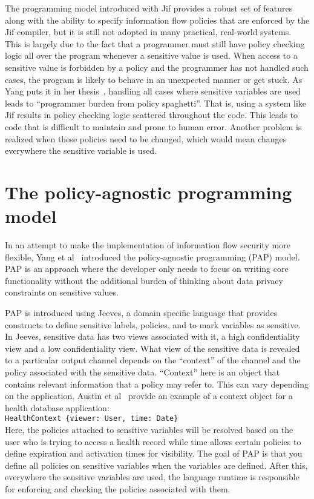 The programming model introduced with Jif provides a robust set of features along
with the ability to specify information flow policies that are enforced by the Jif
compiler, but it is still not adopted in many practical, real-world systems. This
is largely due to the fact that a programmer must still have policy checking logic
all over the program whenever a sensitive value is used. When access to a sensitive
value is forbidden by a policy and the programmer has not handled such cases, the
program is likely to behave in an unexpected manner or get stuck. As Yang puts it
in her thesis~\cite{YangPhd}, handling all cases where sensitive variables are used
leads to ``programmer burden from policy spaghetti''. That is, using a system like
Jif results in policy checking logic scattered throughout the code. This leads to
code that is difficult to maintain and prone to human error. Another problem is
realized when these policies need to be changed, which would mean changes everywhere
the sensitive variable is used.

\section{The policy-agnostic programming model}
In an attempt to make the implementation of information flow security more flexible,
Yang et al~\cite{Jeeves} introduced the policy-agnostic programming (PAP) model.
PAP is an approach where the developer only needs to focus on writing core functionality
without the additional burden of thinking about data privacy constraints on sensitive
values.

PAP is introduced using Jeeves, a domain specific language that provides constructs
to define sensitive labels, policies, and to mark variables as sensitive. In
Jeeves, sensitive data has two views associated with it, a high confidentiality
view and a low confidentiality view. What view of the sensitive data is revealed
to a particular output channel depends on the ``context'' of the channel and the
policy associated with the sensitive data. ``Context'' here is an object that contains
relevant information that a policy may refer to. This can vary depending on the
application. Austin et al~\cite{FacetedJeeves} provide an example of a context
object for a health database application:\\
\indent \indent \texttt{HealthContext \{viewer: User, time: Date\}}\\
Here, the policies attached to sensitive variables will be resolved based on the
user who is trying to access a health record while time allows certain policies
to define expiration and activation times for visibility.
The goal of PAP is that you define all policies on sensitive variables when the
variables are defined. After this, everywhere the sensitive variables are used,
the language runtime is responsible for enforcing and checking the policies
associated with them.

